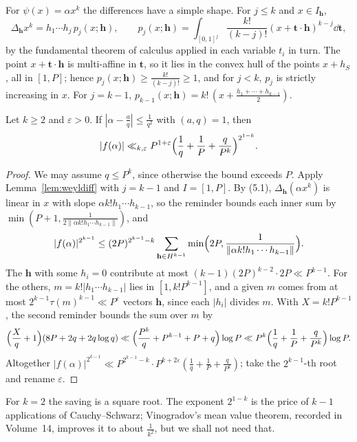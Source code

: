 For $\psi(x)=\alpha x^k$ the differences have a simple shape. For $j\le k$ and $x\in I_{\mathbf h}$,
\[
\Delta_{\mathbf h}x^k=h_1\cdots h_j\,p_j(x;\mathbf h),\qquad p_j(x;\mathbf h)=\int_{[0,1]^j}\frac{k!}{(k-j)!}(x+\mathbf t\cdot\mathbf h)^{k-j}\dd\mathbf t,\tag{5.1}
\]
by the fundamental theorem of calculus applied in each variable $t_i$ in turn. The point $x+\mathbf t\cdot\mathbf h$ is multi-affine in $\mathbf t$, so it lies in the convex hull of the points $x+h_S$, all in $[1,P]$; hence $p_j(x;\mathbf h)\ge\frac{k!}{(k-j)!}\ge1$, and for $j<k$, $p_j$ is strictly increasing in $x$. For $j=k-1$, $p_{k-1}(x;\mathbf h)=k!\,(x+\frac{h_1+\cdots+h_{k-1}}2)$.

\begin{theorem}\label{thm:weylk}
Let $k\ge2$ and $\varepsilon>0$. If $|\alpha-\frac aq|\le\frac1{q^2}$ with $(a,q)=1$, then
\[
|f(\alpha)|\ll_{k,\varepsilon}P^{1+\varepsilon}\Bigl(\frac1q+\frac1P+\frac q{P^k}\Bigr)^{2^{1-k}}.
\]
\end{theorem}
\begin{proof}
We may assume $q\le P^k$, since otherwise the bound exceeds $P$. Apply Lemma~\ref{lem:weyldiff} with $j=k-1$ and $I=[1,P]$. By (5.1), $\Delta_{\mathbf h}(\alpha x^k)$ is linear in $x$ with slope $\alpha k!h_1\cdots h_{k-1}$, so the reminder bounds each inner sum by $\min(P+1,\frac1{2\|\alpha k!h_1\cdots h_{k-1}\|})$, and
\[
|f(\alpha)|^{2^{k-1}}\le(2P)^{2^{k-1}-k}\sum_{\mathbf h\in H^{k-1}}\min\Bigl(2P,\frac1{\|\alpha k!h_1\cdots h_{k-1}\|}\Bigr).
\]
The $\mathbf h$ with some $h_i=0$ contribute at most $(k-1)(2P)^{k-2}\cdot2P\ll P^{k-1}$. For the others, $m=k!|h_1\cdots h_{k-1}|$ lies in $[1,k!P^{k-1}]$, and a given $m$ comes from at most $2^{k-1}\tau(m)^{k-1}\ll P^\varepsilon$ vectors $\mathbf h$, since each $|h_i|$ divides $m$. With $X=k!P^{k-1}$, the second reminder bounds the sum over $m$ by
\[
\Bigl(\frac Xq+1\Bigr)(8P+2q+2q\log q)\ll\Bigl(\frac{P^k}q+P^{k-1}+P+q\Bigr)\log P\ll P^k\Bigl(\frac1q+\frac1P+\frac q{P^k}\Bigr)\log P.
\]
Altogether $|f(\alpha)|^{2^{k-1}}\ll P^{2^{k-1}-k}\cdot P^{k+2\varepsilon}(\frac1q+\frac1P+\frac q{P^k})$; take the $2^{k-1}$-th root and rename $\varepsilon$.
\end{proof}

For $k=2$ the saving is a square root. The exponent $2^{1-k}$ is the price of $k-1$ applications of Cauchy--Schwarz; Vinogradov's mean value theorem, recorded in Volume~14, improves it to about $\frac1{k^2}$, but we shall not need that.

